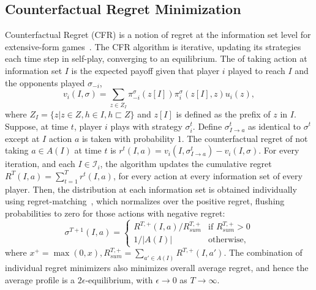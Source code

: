 \documentclass[letterpaper]{article}
\newcommand{\cI}{\mathcal{I}}
\newcommand{\defword}[1]{\textbf{\boldmath{#1}}}
\begin{document}
\subsection{Counterfactual Regret Minimization}

Counterfactual Regret (CFR) is a notion of regret at the information set level for extensive-form games~\cite{CFR}. 
The CFR algorithm is iterative, updating its strategies each time step in self-play, converging to an equilibrium. 
The \defword{counterfactual value} of taking action 
at information set $I$ is the expected payoff given that player $i$ played to reach $I$ and the opponents played 
$\sigma_{-i}$, 
\begin{equation}
\label{eq:cfv}
v_i(I,\sigma) = \sum_{z \in Z_I} \pi^{\sigma}_{-i}(z[I]) \pi^{\sigma}_{i}(z[I],z) u_i(z), 
\end{equation}
where $Z_I = \{ z | z \in Z, h \in I, h \sqsubset Z \}$ and $z[I]$ is defined as the prefix of $z$ in $I$. 
Suppose, at time $t$, player $i$ plays with strategy $\sigma^t_i$. 
Define $\sigma^t_{I \rightarrow a}$ as identical to $\sigma^t$ except at $I$ action $a$ is taken with probability $1$. 
The counterfactual regret of not taking $a \in A(I)$ at time $t$ is $r^t(I,a) = v_i(I,\sigma^t_{I \rightarrow a}) - v_i(I,\sigma)$. 
For every iteration, and each $I \in \cI_i$, the algorithm updates the cumulative regret $R^T(I,a) = \sum_{t=1}^T r^t(I,a)$, for every
action at every information set of every player. 
Then, the distribution at each information set is obtained individually using regret-matching~\cite{Hart00}, which normalizes over the 
positive regret, flushing probabilities to zero for those actions with negative regret:
\begin{equation}
\label{eq:rm}
\sigma^{T+1}(I,a) = \left\{
\begin{array}{ll}
R^{T,+}(I,a) / R^{T,+}_{sum} & \mbox{if } R^{T,+}_{sum} > 0 \\ 
1 / |A(I)|                   & \mbox{otherwise,}
\end{array} \right.
\end{equation}
where $x^+ = \max(0,x), R^{T,+}_{sum} = \sum_{a' \in A(I)} R^{T,+}(I,a')$. 
The combination of individual regret minimizers
also minimizes overall average regret, and hence the average profile is a $2\epsilon$-equilibrium, with $\epsilon \rightarrow 0$
as $T \rightarrow \infty$.
\end{document}
